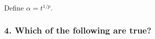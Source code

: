 Define $\alpha = t^{1/p}$.

\paragraph*{}

\subsubsection*{4. Which of the following are true?}
\paragraph*{}

\paragraph*{}

\paragraph*{}

\paragraph*{}

\paragraph*{}